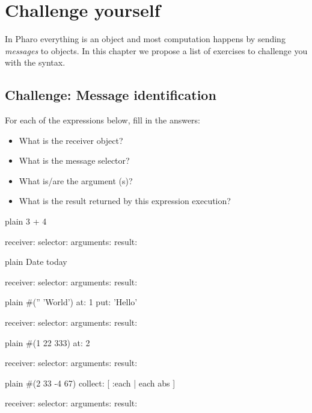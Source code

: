 \documentclass[10pt,twoside,english]{_support/latex/sbabook/sbabook}
\begin{document}
\frontmatter
\pagestyle{plain}

\tableofcontents*
\clearpage\listoffigures

\mainmatter

\chapter{Challenge yourself}\label{cha:challenging}
In Pharo everything is an object and most computation happens by sending  \textit{messages} to objects. In this chapter we propose a list of exercises to challenge you with the syntax.
\section{Challenge: Message identification}
For each of the expressions below, fill in the answers:

\begin{itemize}
\item What is the receiver object?
\item What is the message selector?
\item What is/are the argument (s)?
\item What is the result returned by this expression execution?
\end{itemize}

\begin{displaycode}{plain}
3 + 4

	receiver: 
	selector:
	arguments:
	result:
\end{displaycode}

\begin{displaycode}{plain}
Date today

	receiver: 
	selector:
	arguments:
	result:
\end{displaycode}

\begin{displaycode}{plain}
#('' 'World') at: 1 put: 'Hello'

	receiver: 
	selector:
	arguments:
	result:
\end{displaycode}

\begin{displaycode}{plain}
#(1 22 333) at: 2

	receiver: 
	selector:
	arguments:
	result:
\end{displaycode}

\begin{displaycode}{plain}
#(2 33 -4 67) collect: [ :each | each abs ]

	receiver: 
	selector:
	arguments:
	result:
\end{displaycode}
\end{document}
